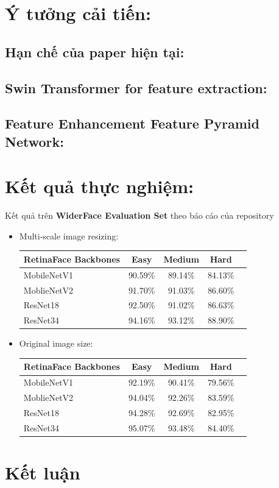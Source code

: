 \documentclass[12pt, a4paper, oneside]{book}
\theoremstyle{plain}
\numberwithin{equation}{chapter} \DeclareMathOperator{\Var}{var}
\begin{document}
\chapter{Ý tưởng cải tiến:}
\section{Hạn chế của paper hiện tại:}
\section{Swin Transformer for feature extraction:}
\section{Feature Enhancement Feature Pyramid Network:}


\chapter{Kết quả thực nghiệm:}
Kết quả trên \textbf{WiderFace Evaluation Set} theo báo cáo của repository

\begin{itemize}
    \item[--] Multi-scale image resizing:
    \begin{center}
    \begin{tabular}{|l|c|c|c|c|}
        \hline
        \textbf{RetinaFace Backbones} & \textbf{Easy} & \textbf{Medium} & \textbf{Hard} \\
        \hline
        MobileNetV1 & 90.59\% & 89.14\% & 84.13\% \\
        \hline
        MoblieNetV2 & 91.70\% & 91.03\% & 86.60\% \\
        \hline
        ResNet18 & 92.50\% & 91.02\% & 86.63\% \\
        \hline
        ResNet34 & 94.16\% & 93.12\% & 88.90\% \\
        \hline  
    \end{tabular}
    \end{center} 
    \item[--] Original image size:  
    \begin{center}
    \begin{tabular}{|l|c|c|c|c|}
        \hline
        \textbf{RetinaFace Backbones} & \textbf{Easy} & \textbf{Medium} & \textbf{Hard} \\
        \hline
        MobileNetV1 & 92.19\% & 90.41\% & 79.56\% \\
        \hline
        MoblieNetV2 & 94.04\% & 92.26\% & 83.59\% \\
        \hline
        ResNet18 & 94.28\% & 92.69\% & 82.95\% \\
        \hline
        ResNet34 & 95.07\% & 93.48\% & 84.40\% \\
        \hline  
    \end{tabular}
    \end{center}
\end{itemize}



\chapter{Kết luận}


\newpage


\end{document}
